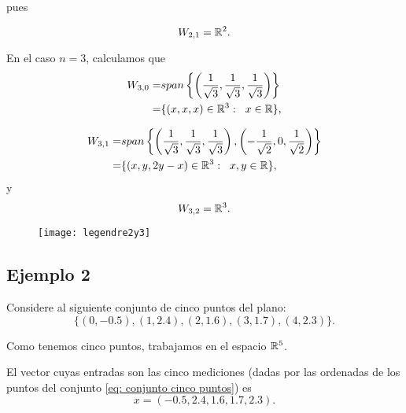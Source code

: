 {pues

\begin{equation*}
\label{eq1: 1Dic}
W_{2,1}= \mathbb{R}^{2}.
\end{equation*}


En el caso $n=3$, calculamos que
\begin{align*}
W_{3,0}= & span \left\{
\left( \frac{1}{\sqrt3}, \frac{1}{\sqrt3},
\frac{1}{\sqrt3} \right) \right\}  \\
= & \{ (x,x,x) \in \mathbb{R}^{3}: \hspace{0.2cm} x \in \mathbb{R} \},
\end{align*}

\begin{align}
\label{eq2: 1Dic}
W_{3,1}= & span \left\{ \left( \frac{1}{\sqrt3}, \frac{1}{\sqrt3},
\frac{1}{\sqrt3} \right) ,
\left( -\frac{1}{\sqrt2}, 0,  \frac{1}{\sqrt2} \right) \right\}
\nonumber \\
= & \{ (x,y,2y-x) \in \mathbb{R}^{3}: \hspace{0.2cm} x,y \in \mathbb{R} \},
\end{align}
y
\[
W_{3,2}=\mathbb{R}^{3}.
\]

\begin{figure}[H]
	\centering
	\texttt{[image: legendre2y3]} 
\end{figure}	
	 




\subsection{Ejemplo 2}
\label{subs: ejm 2}

Considere al siguiente conjunto de cinco
puntos del plano:
\begin{equation} \label{eq: conjunto cinco puntos}
\{ (0,-0.5), (1,2.4), (2, 1.6), (3,1.7), (4, 2.3) \}.
\end{equation}


Como tenemos cinco puntos, trabajamos
en el espacio $\mathbb{R}^{5}$. 

El vector cuyas entradas
son las cinco mediciones (dadas por las ordenadas
de los puntos del conjunto \eqref{eq: conjunto cinco puntos})
es
\begin{equation}
\label{eq0: 29Nov}
x=(-0.5, 2.4, 1.6, 1.7, 2.3).
\end{equation}


}
